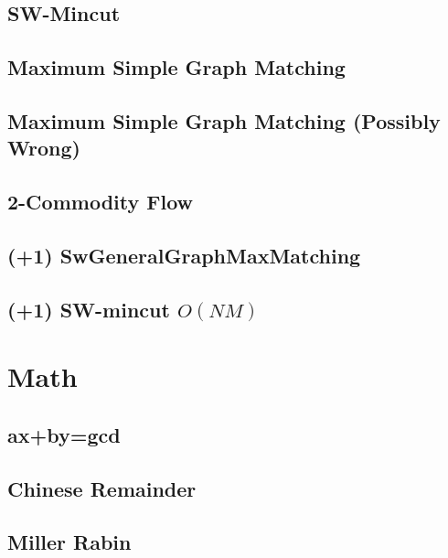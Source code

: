 \documentclass[10pt,twocolumn,oneside]{article}
\begin{document}
\subsection{SW-Mincut}


\subsection{Maximum Simple Graph Matching}


\subsection{Maximum Simple Graph Matching (Possibly Wrong)}


\subsection{2-Commodity Flow}


\subsection{(+1) SwGeneralGraphMaxMatching}


\subsection{(+1) SW-mincut $O(NM)$}


\section{Math}
\subsection{ax+by=gcd}


\subsection{Chinese Remainder}


\subsection{Miller Rabin}

\end{document}
